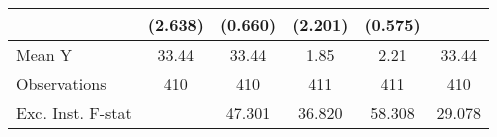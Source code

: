 {\begin{tabular}{l*{5}{c}}
            &     (2.638)         &     (0.660)         &     (2.201)         &     (0.575)         &                     \\
\midrule
Mean Y      &       33.44         &       33.44         &        1.85         &        2.21         &       33.44         \\
Observations&         410         &         410         &         411         &         411         &         410         \\
Exc. Inst. F-stat&                     &      47.301         &      36.820         &      58.308         &      29.078         \\
\bottomrule
\end{tabular}
}
